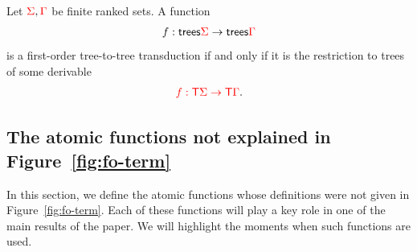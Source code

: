 




\begin{theorem}\label{thm:main}
    Let ${\color{red}{\Sigma}},{\color{red}{\Gamma}}$ be finite ranked sets. A function 
    \begin{align*}
        f : \mathsf {trees} {\color{red}{\Sigma}} \to \mathsf {trees} {\color{red}{\Gamma}}
    \end{align*}
    is a first-order tree-to-tree transduction if and only if it is the restriction to trees of some derivable
    \begin{align*}
        {\color{red}{f : {\color{red}{\mathsf T}}\Sigma \to {\color{red}{\mathsf T}}\Gamma}}.
    \end{align*}
    
\end{theorem}



\subsection{The atomic functions not explained in Figure~\ref{fig:fo-term}}
\label{sec:atomic-and-combinators}
In this section, we define the atomic functions whose definitions were not given in Figure~\ref{fig:fo-term}. 
Each of these functions will play a key role in one of the main results of the paper. We will highlight the moments when such functions are used.  


